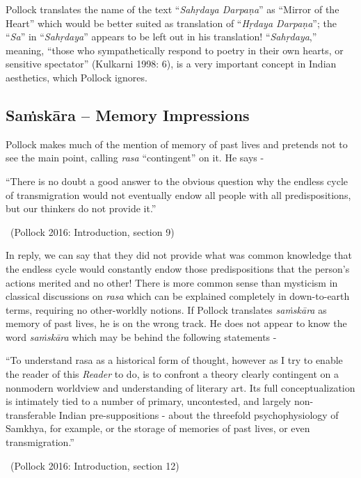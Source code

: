 Pollock translates the name of the text “\textit{Sahṛdaya Darpaṇa}” as “Mirror of the Heart” which would be better suited as translation of “\textit{Hṛdaya Darpaṇa}”; the “\textit{Sa}” in “\textit{Sahṛdaya}” appears to be left out in his translation! “\textit{Sahṛdaya},” meaning, “those who sympathetically respond to poetry in their own hearts, or sensitive spectator” (Kulkarni 1998: 6), is a very important concept in Indian aesthetics, which Pollock ignores.


\subsection*{Saṁskāra – Memory Impressions}

Pollock makes much of the mention of memory of past lives and pretends not to see the main point, calling \textit{rasa} “contingent” on it. He says -

\begin{myquote}
“There is no doubt a good answer to the obvious question why the endless cycle of transmigration would not eventually endow all people with all predispositions, but our thinkers do not provide it.” 

~\hfill (Pollock 2016: Introduction, section 9)
\end{myquote}

In reply, we can say that they did not provide what was common knowledge that the endless cycle would constantly endow those predispositions that the person’s actions merited and no other! There is more common sense than mysticism in classical discussions on \textit{rasa} which can be explained completely in down-to-earth terms, requiring no other-worldly notions. If Pollock translates \textit{saṁskāra} as memory of past lives, he is on the wrong track. He does not appear to know the word \textit{saṁskāra} which may be behind the following statements -

\begin{myquote}
“To understand rasa as a historical form of thought, however as I try to enable the reader of this \textit{Reader} to do, is to confront a theory clearly contingent on a nonmodern worldview and understanding of literary art. Its full conceptualization is intimately tied to a number of primary, uncontested, and largely non-transferable Indian pre-suppositions - about the threefold psychophysiology of Samkhya, for example, or the storage of memories of past lives, or even transmigration.” 

~\hfill (Pollock 2016: Introduction, section 12)
\end{myquote}

